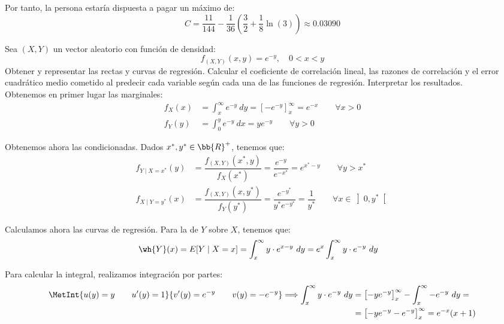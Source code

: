 \begin{ejercicio}
\begin{enumerate}
        Por tanto, la persona estaría dispuesta a pagar un máximo de:
        \begin{equation*}
            C = \dfrac{11}{144}-\dfrac{1}{36}\left(\dfrac{3}{2} + \dfrac{1}{8}\ln(3)\right) \approx 0.03090
        \end{equation*}
    \end{enumerate}
\end{ejercicio}

\begin{ejercicio}
    Sea $(X,Y)$ un vector aleatorio con función de densidad:
    \begin{equation*}
        f_{(X,Y)}(x, y) = e^{-y}, \quad 0 < x < y
    \end{equation*}
    Obtener y representar las rectas y curvas de regresión. Calcular el coeficiente de correlación lineal, las razones de correlación y el error cuadrático medio cometido al predecir cada variable según cada una de las funciones de regresión. Interpretar los resultados.\\

    Obtenemos en primer lugar las marginales:
    \begin{align*}
        f_X(x) &= \int_{x}^{\infty} e^{-y} \ dy = \left[-e^{-y}\right]_{x}^{\infty} = e^{-x} \qquad \forall x>0\\
        f_Y(y) &= \int_{0}^{y} e^{-y} \ dx = ye^{-y} \qquad \forall y>0
    \end{align*}

    Obtenemos ahora las condicionadas. Dados $x^*, y^*\in\bb{R}^+$, tenemos que:
    \begin{align*}
        f_{Y\mid X=x^*}(y) &= \dfrac{f_{(X,Y)}(x^*, y)}{f_X(x^*)} = \dfrac{e^{-y}}{e^{-x^*}} = e^{x^*-y} \qquad \forall y>x^*\\
        f_{X\mid Y=y^*}(x) &= \dfrac{f_{(X,Y)}(x, y^*)}{f_Y(y^*)} = \dfrac{e^{-y^*}}{y^*e^{-y^*}} = \dfrac{1}{y^*} \qquad \forall x\in \left]0, y^*\right[
    \end{align*}

    Calculamos ahora las curvas de regresión. Para la de $Y$ sobre $X$, tenemos que:
    \begin{align*}
        \wh{Y}(x) &= E[Y\mid X=x] = \int_{x}^{\infty} y\cdot e^{x-y} \ dy = e^x\int_{x}^{\infty} y\cdot e^{-y} \ dy
    \end{align*}

    Para calcular la integral, realizamos integración por partes:
    \begin{align*}
        \MetInt{u(y)=y\qquad u'(y)=1}{v'(y)=e^{-y}\qquad v(y)=-e^{-y}}
        \Longrightarrow
        \int_x^{\infty} y\cdot e^{-y} \ dy &= \left[-ye^{-y}\right]_{x}^{\infty} - \int_x^{\infty} -e^{-y} \ dy
        =\\&= \left[-ye^{-y}-e^{-y}\right]_{x}^{\infty} = e^{-x}(x+1)
    \end{align*}


\end{ejercicio}
